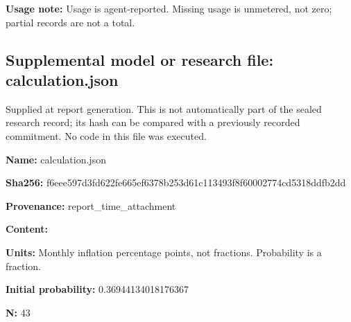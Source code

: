\documentclass[11pt]{article}
\begin{document}
\par\noindent\textbf{Usage note:} Usage is agent-reported. Missing usage is unmetered, not zero; partial records are not a total.

\subsection*{\textcolor{epdarkgreen}{Supplemental model or research file: calculation.json}}
Supplied at report generation. This is not automatically part of the sealed research record; its hash can be compared with a previously recorded commitment. No code in this file was executed.


\par\noindent\textbf{Name:} calculation.json

\par\noindent\textbf{Sha256:} f6eee597d3fd\hspace{0pt}622fe665ef63\hspace{0pt}78b253d61c11\hspace{0pt}3493f8f60002\hspace{0pt}774cd5318ddf\hspace{0pt}b2dd

\par\noindent\textbf{Provenance:} report\_time\_attachment

\par\noindent\textbf{Content:} \par \par\noindent\textbf{Units:} Monthly inflation percentage points, not fractions. Probability is a fraction.

\par\noindent\textbf{Initial probability:} 0.36944134018176367

\par\noindent\textbf{N:} 43
\end{document}
